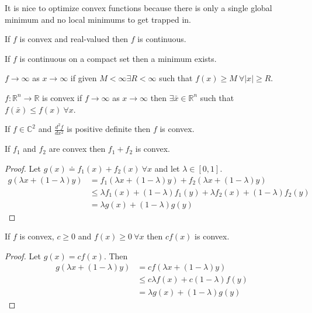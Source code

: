 It is nice to optimize convex functions because there is only a single global minimum and no local minimums to get trapped in.

\begin{theorem}
If $f$ is convex and real-valued then $f$ is continuous.
\end{theorem}

\begin{theorem}
If $f$ is continuous on a compact set then a minimum exists.
\end{theorem}

\begin{definition}
$f\to\infty$ as $x\to\infty$ if given $M<\infty \exists R<\infty$ such that $f(x)\geq M ~\forall |x|\geq R$.
\end{definition}

\begin{theorem}
$f:\mathbb{R}^n\to\mathbb{R}$ is convex if $f\to\infty$ as $x\to\infty$ then $\exists \bar{x}\in\mathbb{R}^n$ such that $f(\bar{x})\leq f(x) ~\forall x$.
\end{theorem}

\begin{theorem}
If $f\in\mathbb{C}^2$ and $\frac{d^2f}{dx^2}$ is positive definite then $f$ is convex.
\end{theorem}

\begin{theorem}
\label{th:sumConvex}
If $f_1$ and $f_2$ are convex then $f_1+f_2$ is convex.
\end{theorem}

\begin{proof}
Let $g(x) \doteq f_1(x) + f_2(x) ~\forall x$ and let $\lambda\in[0,1]$.
\begin{align*}
g(\lambda x + (1-\lambda)y) &= f_1(\lambda x+(1-\lambda)y) + f_2(\lambda x+(1-\lambda)y) \\
&\leq \lambda f_1(x) + (1-\lambda)f_1(y) + \lambda f_2(x) + (1-\lambda)f_2(y) \\
&= \lambda g(x) + (1-\lambda)g(y)
\end{align*}
\end{proof}

\begin{theorem}
\label{th:cfxconvex}
If $f$ is convex, $c\geq 0$ and $f(x)\geq 0 ~\forall x$ then $cf(x)$ is convex.
\end{theorem}

\begin{proof}
Let $g(x)=cf(x)$. Then
\begin{align*}
g(\lambda x+(1-\lambda)y) &= cf(\lambda x+(1-\lambda)y) \\
&\leq c\lambda f(x) + c(1-\lambda)f(y) \\
&= \lambda g(x) + (1-\lambda)g(y)
\end{align*}
\end{proof}

